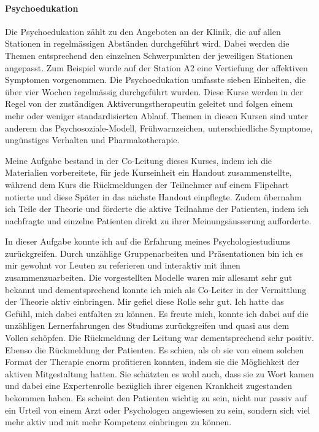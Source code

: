 \paragraph{Psychoedukation}
Die Psychoedukation zählt zu den Angeboten an der Klinik, die auf allen Stationen in regelmässigen Abständen durchgeführt wird. Dabei werden die Themen entsprechend den einzelnen Schwerpunkten der jeweiligen Stationen angepasst. Zum Beispiel wurde auf der Station A2 eine Vertiefung der affektiven Symptomen vorgenommen. Die Psychoedukation umfasste sieben Einheiten, die über vier Wochen regelmässig durchgeführt wurden. Diese Kurse werden in der Regel von der zuständigen Aktiverungstherapeutin geleitet und folgen einem mehr oder weniger standardisierten Ablauf. Themen in diesen Kursen sind unter anderem das Psychosoziale-Modell, Frühwarnzeichen, unterschiedliche Symptome, ungünstiges Verhalten und Pharmakotherapie.

Meine Aufgabe bestand in der Co-Leitung dieses Kurses, indem ich die Materialien vorbereitete, für jede Kurseinheit ein Handout zusammenstellte, während dem Kurs die Rückmeldungen der Teilnehmer auf einem Flipchart notierte und diese Später in das nächste Handout einpflegte. Zudem übernahm ich Teile der Theorie und förderte die aktive Teilnahme der Patienten, indem ich nachfragte und einzelne Patienten direkt zu ihrer Meinungsäusserung aufforderte. 

In dieser Aufgabe konnte ich auf die Erfahrung meines Psychologiestudiums zurückgreifen. Durch unzählige Gruppenarbeiten und Präsentationen bin ich es mir gewohnt vor Leuten zu referieren und interaktiv mit ihnen zusammenzuarbeiten. Die vorgestellten Modelle waren mir allesamt sehr gut bekannt und dementsprechend konnte ich mich als Co-Leiter in der Vermittlung der Theorie aktiv einbringen. Mir gefiel diese Rolle sehr gut. Ich hatte das Gefühl, mich dabei entfalten zu können. Es freute mich, konnte ich dabei auf die unzähligen Lernerfahrungen des Studiums zurückgreifen und quasi aus dem Vollen schöpfen. Die Rückmeldung der Leitung war dementsprechend sehr positiv. Ebenso die Rückmeldung der Patienten. Es schien, als ob sie von einem solchen Format der Therapie enorm profitieren konnten, indem sie die Möglichkeit der aktiven Mitgestaltung hatten. Sie schätzten es wohl auch, dass sie zu Wort kamen und dabei eine Expertenrolle bezüglich ihrer eigenen Krankheit zugestanden bekommen haben. Es scheint den Patienten wichtig zu sein, nicht nur passiv auf ein Urteil von einem Arzt oder Psychologen angewiesen zu sein, sondern sich viel mehr aktiv und mit mehr Kompetenz einbringen zu können.

